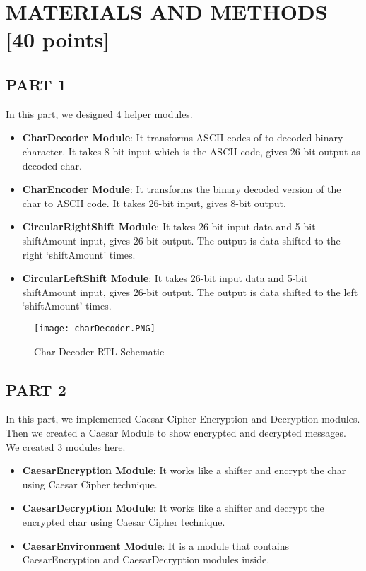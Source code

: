 \documentclass[pdftex,12pt,a4paper]{article}
\begin{document}
\section{MATERIALS AND METHODS [40 points]}



\subsection{PART 1}
In this part, we designed 4 helper modules. 

\begin{itemize}
\item \textbf{CharDecoder Module}: It transforms ASCII codes of to decoded binary character. It takes 8-bit input which is the ASCII code, gives 26-bit output as decoded char.

\item \textbf{CharEncoder Module}: It transforms the binary decoded version of the char to ASCII code. It takes 26-bit input, gives 8-bit output.

\item \textbf{CircularRightShift Module}: It takes 26-bit input data and 5-bit shiftAmount input, gives 26-bit output. The output is data shifted to the right ‘shiftAmount’ times.
 
\item \textbf{CircularLeftShift Module}: It takes 26-bit input data and 5-bit shiftAmount input, gives 26-bit output. The output is data shifted to the left ‘shiftAmount’ times.
\end{itemize}



\begin{figure}[ht]
	\centering
	\texttt{[image: charDecoder.PNG]}	
	\caption{Char Decoder RTL Schematic}
	\label{}
\end{figure}

\clearpage
\subsection{PART 2}
In this part, we implemented Caesar Cipher Encryption and Decryption modules. Then we created a Caesar Module to show encrypted and decrypted messages. We created 3 modules here.

\begin{itemize}
\item \textbf{CaesarEncryption Module}: It works like a shifter and encrypt the char using Caesar Cipher technique.

\item \textbf{CaesarDecryption Module}: It works like a shifter and decrypt the encrypted char using Caesar Cipher technique.

\item \textbf{CaesarEnvironment Module}: It is a module that contains CaesarEncryption and CaesarDecryption modules inside.
\end{itemize}
\end{document}
